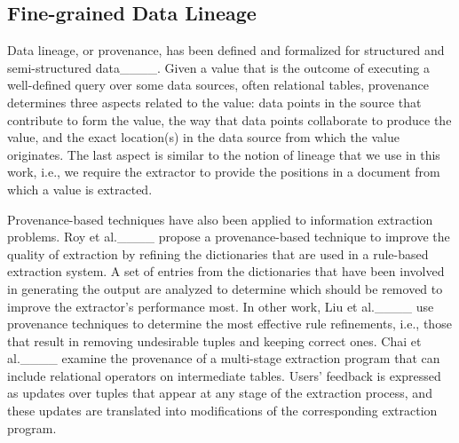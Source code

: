 




\subsection{Fine-grained Data Lineage} 
Data lineage, or provenance, has been defined and formalized for structured and semi-structured data____. Given a value that is the outcome  of executing a well-defined query over some data sources, often relational tables, provenance determines three aspects related to the value: data points in the source that contribute to form the value, the way that data points collaborate to produce the value, and the exact location(s) in the data source from which the value originates. The last aspect is similar to the notion of lineage that we use in this work, i.e., we require the extractor to provide the positions in a document from which a value is extracted.

Provenance-based techniques have also been applied to information extraction problems. Roy et al.____ propose a provenance-based technique to improve the quality of extraction by refining the dictionaries that are used in a rule-based extraction system. A set of entries from the dictionaries that have been involved in generating the output are analyzed to determine which should be removed to improve the extractor's performance most.  In other work, Liu et al.____ use provenance techniques to determine the most effective rule refinements, i.e., those that result in removing undesirable tuples and keeping correct ones.
Chai et al.____ examine the provenance of a multi-stage extraction program that can include relational operators on intermediate tables. Users' feedback is expressed as updates over tuples that appear at any stage of the extraction process, and these updates are translated into modifications of the corresponding extraction program.    

